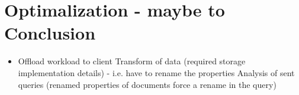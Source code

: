 \section{Optimalization - maybe to Conclusion}
\begin{itemize}
	\item Offload workload to client
		\subitem Transform of data (required storage implementation details) - i.e. have to rename the properties
		\subitem Analysis of sent queries (renamed properties of documents force a rename in the query)
\end{itemize}





